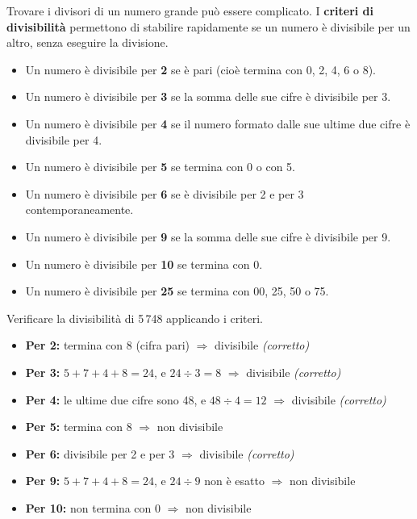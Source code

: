Trovare i divisori di un numero grande può essere complicato. I \textbf{criteri
    di divisibilità} permettono di stabilire rapidamente se un numero è divisibile
per un altro, senza eseguire la divisione.

\begin{regola}
    \begin{itemize}[leftmargin=1.5em]
        \item Un numero è divisibile per \textbf{2} se è pari (cioè termina con
              0, 2, 4, 6 o 8).
        \item Un numero è divisibile per \textbf{3} se la somma delle sue cifre
              è divisibile per 3.
        \item Un numero è divisibile per \textbf{4} se il numero formato dalle
              sue ultime due cifre è divisibile per 4.
        \item Un numero è divisibile per \textbf{5} se termina con 0 o con 5.
        \item Un numero è divisibile per \textbf{6} se è divisibile per 2 e per 3
              contemporaneamente.
        \item Un numero è divisibile per \textbf{9} se la somma delle sue cifre
              è divisibile per 9.
        \item Un numero è divisibile per \textbf{10} se termina con 0.
        \item Un numero è divisibile per \textbf{25} se termina con 00, 25, 50 o 75.
    \end{itemize}
\end{regola}

\begin{esempio}
    Verificare la divisibilità di 5\,748 applicando i criteri.

    \begin{itemize}[leftmargin=1.5em]
        \item \textbf{Per 2:} termina con 8 (cifra pari) \quad$\Rightarrow$\quad
              divisibile \quad\textit{(corretto)}
        \item \textbf{Per 3:} $5 + 7 + 4 + 8 = 24$, e $24 \div 3 = 8$ \quad$\Rightarrow$\quad
              divisibile \quad\textit{(corretto)}
        \item \textbf{Per 4:} le ultime due cifre sono 48, e $48 \div 4 = 12$ \quad$\Rightarrow$\quad
              divisibile \quad\textit{(corretto)}
        \item \textbf{Per 5:} termina con 8 \quad$\Rightarrow$\quad
              non divisibile
        \item \textbf{Per 6:} divisibile per 2 e per 3 \quad$\Rightarrow$\quad
              divisibile \quad\textit{(corretto)}
        \item \textbf{Per 9:} $5 + 7 + 4 + 8 = 24$, e $24 \div 9$ non è esatto \quad$\Rightarrow$\quad
              non divisibile
        \item \textbf{Per 10:} non termina con 0 \quad$\Rightarrow$\quad
              non divisibile
    \end{itemize}
\end{esempio}


